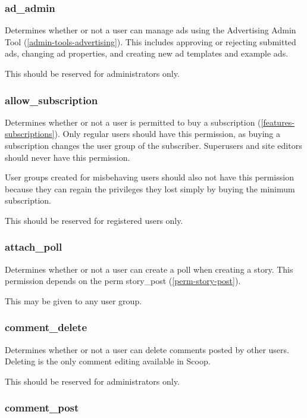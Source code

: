 \subsubsection{ad\_admin}
\label{perm-ad-admin}

Determines whether or not a user can manage ads using the Advertising Admin Tool (\ref{admin-tools-advertising}).  This includes approving or rejecting submitted ads, changing ad properties, and creating new ad templates and example ads.

This should be reserved for administrators only.

\subsubsection{allow\_subscription}
\label{perm-allow-subscription}

Determines whether or not a user is permitted to buy a subscription (\ref{features-subscriptions}). Only regular users should have this permission, as buying a subscription changes the user group of the subscriber. Superusers and site editors should never have this permission.

User groups created for misbehaving users should also not have this permission because they can regain the privileges they lost simply by buying the minimum subscription.

This should be reserved for registered users only.

\subsubsection{attach\_poll}
\label{perm-attach-poll}

Determines whether or not a user can create a poll when creating a story.  This permission depends on the perm story\_post (\ref{perm-story-post}).

This may be given to any user group.

\subsubsection{comment\_delete}
\label{perm-comment-delete}

Determines whether or not a user can delete comments posted by other users.  Deleting is the only comment editing available in Scoop.

This should be reserved for administrators only.

\subsubsection{comment\_post}
\label{perm-comment-post}


